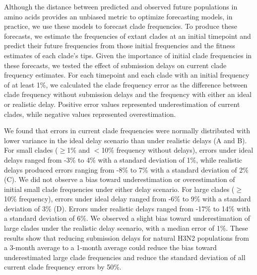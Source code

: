 \documentclass[9pt,lineno]{elife}
\begin{document}
Although the distance between predicted and observed future populations in amino acids provides an unbiased metric to optimize forecasting models, in practice, we use these models to forecast clade frequencies.
To produce these forecasts, we estimate the frequencies of extant clades at an initial timepoint and predict their future frequencies from those initial frequencies and the fitness estimates of each clade's tips.
Given the importance of initial clade frequencies in these forecasts, we tested the effect of submission delays on current clade frequency estimates.
For each timepoint and each clade with an initial frequency of at least 1\%, we calculated the clade frequency error as the difference between clade frequency without submission delays and the frequency with either an ideal or realistic delay.
Positive error values represented underestimation of current clades, while negative values represented overestimation.

We found that errors in current clade frequencies were normally distributed with lower variance in the ideal delay scenario than under realistic delays (A and B).
For small clades ($\ge$1\% and $<$10\% frequency without delays), errors under ideal delays ranged from -3\% to 4\% with a standard deviation of 1\%, while realistic delays produced errors ranging from -8\% to 7\% with a standard deviation of 2\% (C).
We did not observe a bias toward underestimation or overestimation of initial small clade frequencies under either delay scenario.
For large clades ($\ge$10\% frequency), errors under ideal delay ranged from -6\% to 9\% with a standard deviation of 3\% (D).
Errors under realistic delays ranged from -17\% to 14\% with a standard deviation of 6\%.
We observed a slight bias toward underestimation of large clades under the realistic delay scenario, with a median error of 1\%.
These results show that reducing submission delays for natural H3N2 populations from a 3-month average to a 1-month average could reduce the bias toward underestimated large clade frequencies and reduce the standard deviation of all current clade frequency errors by 50\%.
\end{document}

